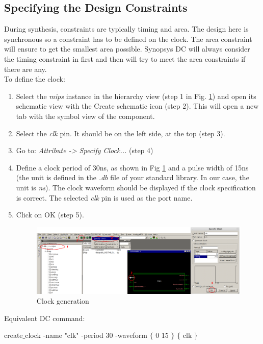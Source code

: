 \subsection{Specifying the Design Constraints}
During synthesis, constraints are typically timing and area. The design here is synchronous so a constraint has to be defined on the clock. The area constraint will ensure to get the smallest area possible. Synopsys DC will always consider the timing constraint in first and then will try to meet the area constraints if there are any. \\
To define the clock:
 \begin{enumerate}
 	\item Select the \textit{mips} instance in the hierarchy view (step 1 in Fig. \ref{fig_clock}) and open its schematic view with the Create schematic icon (step 2). This will open a new tab with the symbol view of the component.
 	\item Select the \textit{clk} pin. It should be on the left side, at the top (step 3).
	\item Go to: \textit {Attribute -> Specify Clock...} (step 4)
	\item Define a clock period of 30ns, as shown in Fig \ref{fig_clock} and a pulse width of 15ns (the unit is defined in the \textit{.db} file of your standard library. In our case, the unit is \textit{ns}). The clock waveform should be displayed if the clock specification is correct. The selected \textit{clk} pin is used as the port name.
	\item Click on OK (step 5).
\begin{figure}[!h]
	\centering
	\includegraphics[scale=0.3]{figures/lab3_design_compiler/clockgene}
	\caption{Clock generation}
	\label{fig_clock}
\end{figure}


\end{enumerate}

\clearpage
Equivalent DC command:
	\begin{codeline}
create$\_$clock -name "clk" -period 30 -waveform $\{$ 0 15 $\}$ $\{$ clk $\}$
\end{codeline}

